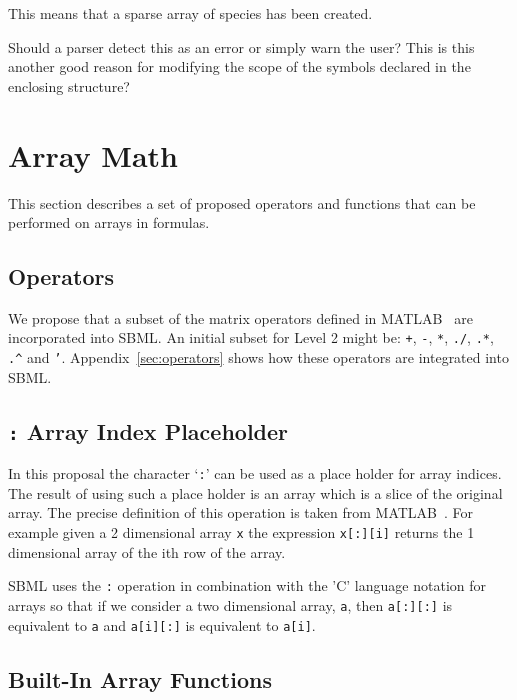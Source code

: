 \documentclass{cekarticle}
\begin{document}
\begin{itemize}
This means that a sparse array of species has been created.

Should a parser detect this as an error or simply warn the user?
This is this another good reason for modifying the
scope of the symbols declared in the enclosing structure?
\end{itemize}

\section{Array Math}
\label{sec:math}

This section describes a set of proposed operators and functions
that can be performed on arrays in formulas.

\subsection{Operators}

We propose that a subset of the matrix operators defined in
MATLAB~\citep{matlab:1998} are incorporated into SBML. An initial
subset for Level 2 might be: \texttt{+}, \texttt{-}, \texttt{*},
\texttt{./}, \texttt{.*}, \verb+.^+ and \texttt{'}.
Appendix~\ref{sec:operators} shows how these operators are
integrated into SBML.

\subsection{\texttt{:} Array Index Placeholder}
\label{sec:placeholder}

In this proposal the character `\texttt{:}' can be used as a
place holder for array indices.  The result of using such a place
holder is an array which is a slice of the original array. The
precise definition of this operation is taken from
MATLAB~\citep{matlab:1998}.  For example given a 2 dimensional
array \texttt{x} the expression \texttt{x[:][i]} returns the 1
dimensional array of the ith row of the array.

SBML uses the \texttt{:} operation in combination with the 'C'
language notation for arrays so that if we consider a two
dimensional array, \texttt{a}, then \texttt{a[:][:]} is
equivalent to \texttt{a} and \texttt{a[i][:]} is equivalent to
\texttt{a[i]}.

\subsection{Built-In Array Functions}
\end{document}

